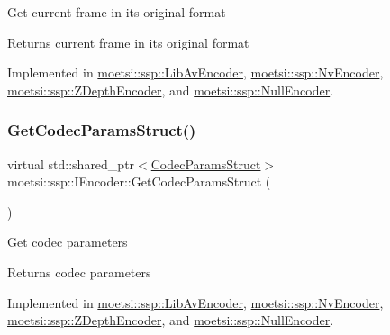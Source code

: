 Get current frame in its original format \begin{DoxyReturn}{Returns}
current frame in its original format 
\end{DoxyReturn}


Implemented in \hyperlink{classmoetsi_1_1ssp_1_1LibAvEncoder_a249c65ad557f438d6856e875f01a1947}{moetsi\+::ssp\+::\+Lib\+Av\+Encoder}, \hyperlink{classmoetsi_1_1ssp_1_1NvEncoder_a56baf331eae448da89ee54b69fec170c}{moetsi\+::ssp\+::\+Nv\+Encoder}, \hyperlink{classmoetsi_1_1ssp_1_1ZDepthEncoder_abe5820ee0dea5fec22e398a7ba4d6777}{moetsi\+::ssp\+::\+Z\+Depth\+Encoder}, and \hyperlink{classmoetsi_1_1ssp_1_1NullEncoder_ad972dfdb93d2f609cdc885c53079ede2}{moetsi\+::ssp\+::\+Null\+Encoder}.

\mbox{\label{classmoetsi_1_1ssp_1_1IEncoder_ad5179efaa4c74207766dd64f46f4059a}} 
\subsubsection{\texorpdfstring{Get\+Codec\+Params\+Struct()}{GetCodecParamsStruct()}}
{\footnotesize\ttfamily virtual std\+::shared\+\_\+ptr$<$\hyperlink{structmoetsi_1_1ssp_1_1CodecParamsStruct}{Codec\+Params\+Struct}$>$ moetsi\+::ssp\+::\+I\+Encoder\+::\+Get\+Codec\+Params\+Struct (\begin{DoxyParamCaption}{ }\end{DoxyParamCaption})\hspace{0.3cm}{\ttfamily [pure virtual]}}

Get codec parameters \begin{DoxyReturn}{Returns}
codec parameters 
\end{DoxyReturn}


Implemented in \hyperlink{classmoetsi_1_1ssp_1_1LibAvEncoder_a2ff6afafbb5da48e900d34d70a46d00c}{moetsi\+::ssp\+::\+Lib\+Av\+Encoder}, \hyperlink{classmoetsi_1_1ssp_1_1NvEncoder_aa6229a43b12d2f27e27f518fc2229b61}{moetsi\+::ssp\+::\+Nv\+Encoder}, \hyperlink{classmoetsi_1_1ssp_1_1ZDepthEncoder_a3fc9f84387dba09d1deb4761031b598f}{moetsi\+::ssp\+::\+Z\+Depth\+Encoder}, and \hyperlink{classmoetsi_1_1ssp_1_1NullEncoder_a29839bd02ad42ecd9cf8e6cce707a9fe}{moetsi\+::ssp\+::\+Null\+Encoder}.

